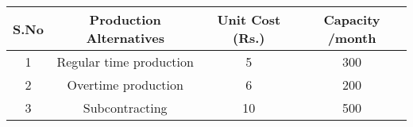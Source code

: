 \begin{center}
\begin{tabular}{|c|c|c|c|}
\hline
   {S.No}  & {Production Alternatives} & {Unit Cost (Rs.)} & {Capacity /month}  \\ \hline
   1  & Regular time production & 5 & 300 \\ \hline
   2 & Overtime production & 6 & 200 \\ \hline
   3 & Subcontracting & 10 & 500 \\ \hline
\end{tabular}
\end{center}